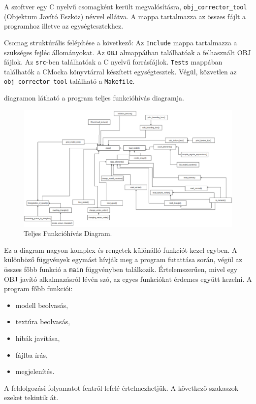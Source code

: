 A szoftver egy C nyelvű csomagként került megvalósításra, \texttt{obj\_corrector\_tool} (Objektum Javító Eszköz) névvel ellátva. A mappa tartalmazza az összes fájlt a programhoz illetve az egységtesztekhez.

Csomag struktúrális felépítése a következő:
\bigskip
{}
\newpage
Az \texttt{Include} mappa tartalmazza a szükséges fejléc állományokat. Az \texttt{OBJ} almappáiban találhatóak a felhasznált OBJ fájlok. Az \texttt{src}-ben találhatóak a C nyelvű forrásfájlok. \texttt{Tests} mappában találhatók a CMocka könyvtárral készített egységtesztek. Végül, közvetlen az \texttt{obj\_corrector\_tool} található a \texttt{Makefile}.


 diagramon látható a program teljes funkcióhívás diagramja.

\begin{figure}[h]
	\centering
	\includegraphics[width=\textwidth]{images/func.png}
	\caption{Teljes Funkcióhívás Diagram.}
	\label{fig:funk}
\end{figure}

Ez a diagram nagyon komplex és rengetek különálló funkciót kezel egyben. A különböző függvények egymást hívják meg a program futattása során, végül az összes főbb funkció a \texttt{main} függvényben találkozik.
Értelemszerűen, mivel egy OBJ javító alkalmazásról lévén szó, az egyes funkciókat érdemes együtt  kezelni. A program főbb funkciói:
 \begin{itemize}
\item modell beolvasás,
\item textúra beolvasás,
\item hibák javítása,
\item fájlba írás,
\item megjelenítés.
\end{itemize}
A feldolgozási folyamatot fentről-lefelé értelmezhetjük.
A következő szakaszok ezeket tekintik át.

